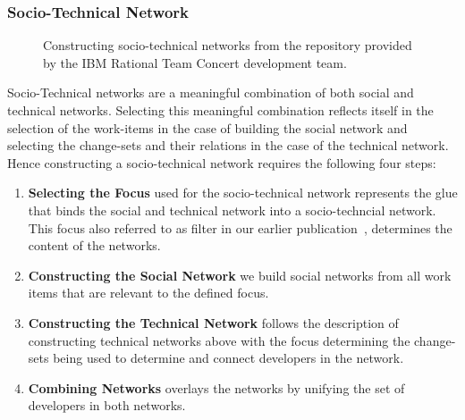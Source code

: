 \subsubsection{Socio-Technical Network}
\begin{figure*}[t!]
%	
  \centering
% 
\hspace{5pt}
\hspace{5pt} 
\hspace{5pt}
  \caption{Constructing socio-technical networks from the repository provided by the IBM Rational Team Concert development team.}
  \label{fig:construct-stc}
\end{figure*}

Socio-Technical networks are a meaningful combination of both social and technical networks.
Selecting this meaningful combination reflects itself in the selection of the work-items in the case of building the social network and selecting the change-sets and their relations in the case of the technical network.
Hence constructing a socio-technical network requires the following four steps:

\begin{enumerate}
\item\textbf{Selecting the Focus} used for the socio-technical network represents the glue that binds the social and technical network into a socio-techncial network. 
This focus also referred to as filter in our earlier publication~\cite{wolf:ieee:2009}, determines the content of the networks.
\item\textbf{Constructing the Social Network} we build social networks from all work items that are relevant to the defined focus.
\item\textbf{Constructing the Technical Network} follows the description of constructing technical networks above with the focus determining the change-sets being used to determine and connect developers in the network.
\item\textbf{Combining Networks} overlays the networks by unifying the set of developers in both networks.
\end{enumerate}

